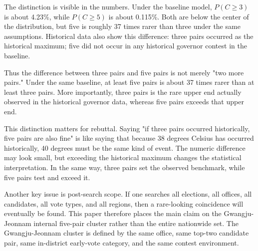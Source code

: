 \documentclass[preprint]{../ieie/IEIE}
\begin{document}
The distinction is visible in the numbers. Under the baseline model, \(P(C \geq 3)\) is about 4.23\%, while \(P(C \geq 5)\) is about 0.115\%. Both are below the center of the distribution, but five is roughly 37 times rarer than three under the same assumptions. Historical data also show this difference: three pairs occurred as the historical maximum; five did not occur in any historical governor contest in the baseline.

\begin{center}
\scriptsize
{}
\end{center}

Thus the difference between three pairs and five pairs is not merely "two more pairs." Under the same baseline, at least five pairs is about 37 times rarer than at least three pairs. More importantly, three pairs is the rare upper end actually observed in the historical governor data, whereas five pairs exceeds that upper end.

This distinction matters for rebuttal. Saying "if three pairs occurred historically, five pairs are also fine" is like saying that because 38 degrees Celsius has occurred historically, 40 degrees must be the same kind of event. The numeric difference may look small, but exceeding the historical maximum changes the statistical interpretation. In the same way, three pairs set the observed benchmark, while five pairs test and exceed it.

Another key issue is post-search scope. If one searches all elections, all offices, all candidates, all vote types, and all regions, then a rare-looking coincidence will eventually be found. This paper therefore places the main claim on the Gwangju-Jeonnam internal five-pair cluster rather than the entire nationwide set. The Gwangju-Jeonnam cluster is defined by the same office, same top-two candidate pair, same in-district early-vote category, and the same contest environment.
\end{document}
